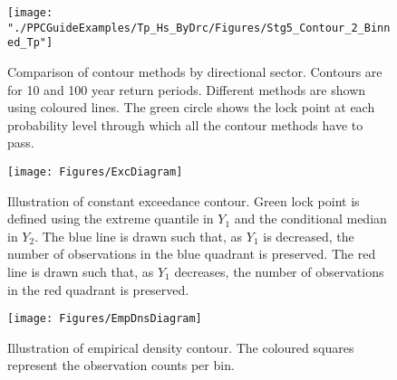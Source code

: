 \begin{figure}
	\centering
	\texttt{[image: "./PPCGuideExamples/Tp\_Hs\_ByDrc/Figures/Stg5\_Contour\_2\_Binned\_Tp"]}
	\caption{Comparison of contour methods by directional sector. Contours are for 10 and 100 year return periods. Different methods are shown using coloured lines. The green circle shows the lock point at each probability level through which all the contour methods have to pass.}
	\label{fig:Stg5_Contour_2_Binned_Tp}
\end{figure}



\begin{figure}[h]
	\centering
	\texttt{[image: Figures/ExcDiagram]}
	\caption{Illustration of constant exceedance contour. Green lock point is defined using the extreme quantile in $Y_1$ and the conditional median in $Y_2$. The blue line is drawn such that, as $Y_1$ is decreased, the number of observations in the blue quadrant is preserved. The red line is drawn such that, as $Y_1$ decreases, the number of observations in the red quadrant is preserved.}
	\label{fig:Stg5_ExcDiagram}
\end{figure}



\begin{figure}[h]
	\centering
	\texttt{[image: Figures/EmpDnsDiagram]}
	\caption{Illustration of empirical density contour. The coloured squares represent the observation counts per bin.}
	\label{fig:Stg5_EmpDnsDiagram}
\end{figure}

\newpage